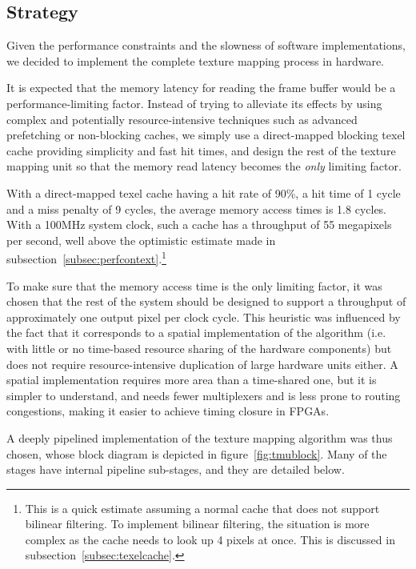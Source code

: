 \documentclass[a4paper,11pt]{kthesis}
\begin{document}
\subsection{Strategy}
\label{subsec:tmustrategy}
Given the performance constraints and the slowness of software implementations, we decided to implement the complete texture mapping process in hardware.

It is expected that the memory latency for reading the frame buffer would be a performance-limiting factor. Instead of trying to alleviate its effects by using complex and potentially resource-intensive techniques such as advanced prefetching or non-blocking caches, we simply use a direct-mapped blocking texel cache providing simplicity and fast hit times, and design the rest of the texture mapping unit so that the memory read latency becomes the \textit{only} limiting factor.

With a direct-mapped texel cache having a hit rate of 90\%, a hit time of 1 cycle and a miss penalty of 9 cycles, the average memory access times is 1.8 cycles. With a 100MHz system clock, such a cache has a throughput of 55 megapixels per second, well above the optimistic estimate made in subsection~\ref{subsec:perfcontext}.\footnote{This is a quick estimate assuming a normal cache that does not support bilinear filtering. To implement bilinear filtering, the situation is more complex as the cache needs to look up 4 pixels at once. This is discussed in subsection~\ref{subsec:texelcache}.}

To make sure that the memory access time is the only limiting factor, it was chosen that the rest of the system should be designed to support a throughput of approximately one output pixel per clock cycle. This heuristic was influenced by the fact that it corresponds to a spatial implementation of the algorithm (i.e. with little or no time-based resource sharing of the hardware components) but does not require resource-intensive duplication of large hardware units either. A spatial implementation requires more area than a time-shared one, but it is simpler to understand, and needs fewer multiplexers and is less prone to routing congestions, making it easier to achieve timing closure in FPGAs.

A deeply pipelined implementation of the texture mapping algorithm was thus chosen, whose block diagram is depicted in figure~\ref{fig:tmublock}. Many of the stages have internal pipeline sub-stages, and they are detailed below.
\end{document}
